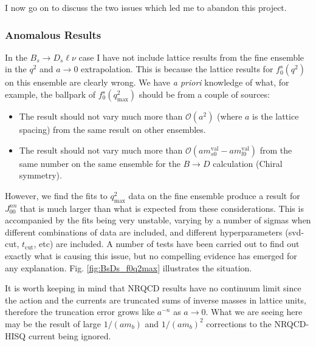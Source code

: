 I now go on to discuss the two issues which led me to abandon this project.

\subsubsection{Anomalous Results}
\label{sec:anomalous}

In the $B_s\to D_s \ell\nu$ case I have not include lattice results from the fine ensemble in the $q^2$ and $a\to 0$ extrapolation. This is because the lattice results for $f_0^s(q^2)$ on this ensemble are clearly wrong. We have {\textit{a priori}} knowledge of what, for example, the ballpark of $f_0^s(q^2_{\text{max}})$ should be from a couple of sources:
\begin{itemize}
\item
The result should not vary much more than $\mathcal{O}(a^2)$ (where $a$ is the lattice spacing) from the same result on other ensembles.
\item
  The result should not vary much more than $\mathcal{O}(am^{\text{val}}_{s0} - am^{\text{val}}_{l0})$ from the same number on the same ensemble for the $B\to D$ calculation (Chiral symmetry).
\end{itemize}
However, we find the fits to $q^2_{\text{max}}$ data on the fine ensemble produce a result for $J^{nn}_{00}$ that is much larger than what is expected from these considerations. This is accompanied by the fits being very unstable, varying by a number of sigmas when different combinations of data are included, and different hyperparameters (svd-cut, $t_{\text{cut}}$, etc) are included. A number of tests have been carried out to find out exactly what is causing this issue, but no compelling evidence has emerged for any explanation. Fig. \ref{fig:BsDs_f0q2max} illustrates the situation.

It is worth keeping in mind that NRQCD results have no continuum limit since the action and the currents are truncated sums of inverse masses in lattice units, therefore the truncation error grows like $a^{-n}$ as $a\to 0$. What we are seeing here may be the result of large $1/(am_b)$ and $1/(am_b)^2$ corrections to the NRQCD-HISQ current being ignored.

